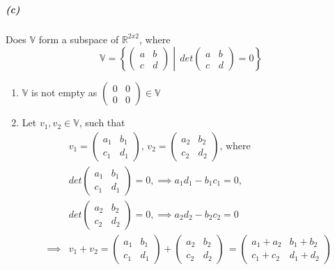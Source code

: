 \documentclass[12pt, letterpaper]{article}
\begin{document}
\subparagraph{(c)} Does $\mathbb{V}$ form a subspace of $\mathbb{R}^{2x2}$, where
\[
  \mathbb{V} = \left\{\begin{pmatrix}a&b\\c&d\end{pmatrix}\middle| \,
  det\begin{pmatrix}a&b\\c&d\end{pmatrix} = 0\right\}
\]

\begin{enumerate}
  \item $\mathbb{V}$ is not empty as $\begin{pmatrix}0&0\\0&0\end{pmatrix}\in\mathbb{V}$
  \item Let $v_1, v_2 \in \mathbb{V}$, such that
  \[
    \begin{split}
    &v_1 = \begin{pmatrix}a_1&b_1\\c_1&d_1\end{pmatrix},\,
    v_2 = \begin{pmatrix}a_2&b_2\\c_2&d_2\end{pmatrix},\,
    \text{where }\\
    &det\begin{pmatrix}a_1&b_1\\c_1&d_1\end{pmatrix} = 0, \implies a_1d_1-b_1c_1 = 0,\\
    &det\begin{pmatrix}a_2&b_2\\c_2&d_2\end{pmatrix} = 0, \implies a_2d_2-b_2c_2 = 0\\
    \implies &v_1 + v_2
    = \begin{pmatrix}a_1&b_1\\c_1&d_1\end{pmatrix} +
    \begin{pmatrix}a_2&b_2\\c_2&d_2\end{pmatrix}\,
    =\begin{pmatrix}a_1 + a_2 &b_1 + b_2\\c_1 + c_2 &d_1 + d_2\end{pmatrix}\\

\end{split}\]
\end{enumerate}
\end{document}
